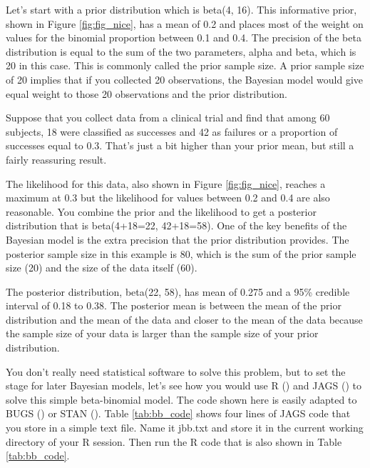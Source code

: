 \documentclass[12pt]{article}
\begin{document}
Let's start with a prior distribution which is beta(4, 16). This informative prior, shown in Figure \ref{fig:fig_nice}, has a mean of 0.2 and places most of the weight on values for the binomial proportion between 0.1 and 0.4. The precision of the beta distribution is equal to the sum of the two parameters, alpha and beta, which is 20 in this case. This is commonly called the prior sample size. A prior sample size of 20 implies that if you collected 20 observations, the Bayesian model would give equal weight to those 20 observations and the prior distribution.

Suppose that you collect data from a clinical trial and find that among 60 subjects, 18 were classified as successes and 42 as failures or a proportion of successes equal to 0.3. That's just a bit higher than your prior mean, but still a fairly reassuring result.

The likelihood for this data, also shown in Figure \ref{fig:fig_nice}, reaches a maximum at 0.3 but the likelihood for values between 0.2 and 0.4 are also reasonable. You combine the prior and the likelihood to get a posterior distribution that is beta(4+18=22, 42+18=58). One of the key benefits of the Bayesian model is the extra precision that the prior distribution provides. The posterior sample size in this example is 80, which is the sum of the prior sample size (20) and the size of the data itself (60).

The posterior distribution, beta(22, 58), has mean of 0.275 and a 95\% credible interval of 0.18 to 0.38. The posterior mean is between the mean of the prior distribution and the mean of the data and closer to the mean of the data because the sample size of your data is larger than the sample size of your prior distribution.

You don't really need statistical software to solve this problem, but to set the stage for later Bayesian models, let's see how you would use R (\cite{r17}) and JAGS (\cite{plummer16}) to solve this simple beta-binomial model. The code shown here is easily adapted to BUGS (\cite{lunn00}) or STAN (\cite{carpenter17}). Table \ref{tab:bb_code} shows four lines of JAGS code that you store in a simple text file. Name it jbb.txt and store it in the current working directory of your R session. Then run the R code that is also shown in Table \ref{tab:bb_code}.

\linespread{1}
\end{document}
